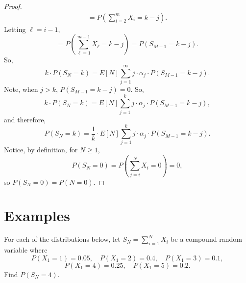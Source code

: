 \documentclass[11pt]{amsart}
\theoremstyle{definition}
\theoremstyle{plain}
\begin{document}
\begin{proof}
\begin{align*}
     = P\!\left(\sum_{i=2}^{m} X_i = k - j\right).
\end{align*}
Letting $\ell = i - 1$,
\[
    = P\!\left(\sum_{\ell=1}^{m-1} X_\ell = k - j\right) = P(S_{M-1} = k - j).
\]
So,
\[
    k \cdot P(S_N = k) = E[N] \sum_{j=1}^{\infty} j \cdot \alpha_j \cdot P(S_{M-1} = k - j).
\]
Note, when $j > k$, $P(S_{M-1} = k - j) = 0$.  So,
\[
    k \cdot P(S_N = k) = E[N] \sum_{j=1}^{k} j \cdot \alpha_j \cdot P(S_{M-1} = k - j),
\]
and therefore,
\[
    P(S_N = k) = \frac{1}{k} \cdot E[N] \sum_{j=1}^{k} j \cdot \alpha_j \cdot P(S_{M-1} = k - j).
\]
Notice, by definition, for $N \geq 1$,
\[
    P(S_N = 0) = P\!\left(\sum_{j=i}^{N} X_i = 0\right) = 0,
\]
so $P(S_N = 0) = P(N = 0)$.
\end{proof}

\section{Examples}

For each of the distributions below, let $S_N = \sum_{i=1}^{N} X_i$ be a compound
random variable where
\[
    P(X_1 = 1) = 0.05, \quad P(X_1 = 2) = 0.4, \quad P(X_1 = 3) = 0.1,
\]
\[
    P(X_1 = 4) = 0.25, \quad P(X_1 = 5) = 0.2.
\]
Find $P(S_N = 4)$.
\end{document}

